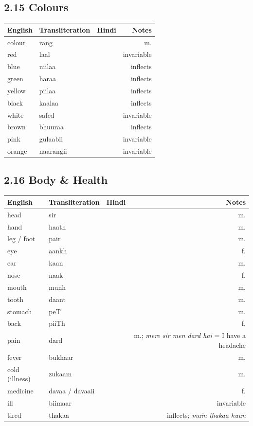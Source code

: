 \subsection{2.15 Colours}

\begin{tabular}{@{}VTDN@{}}
  \toprule
  English & Transliteration & Hindi & Notes \\
  \midrule
  colour & rang &  & m. \\
  red & laal &  & invariable \\
  blue & niilaa &  & inflects \\
  green & haraa &  & inflects \\
  yellow & piilaa &  & inflects \\
  black & kaalaa &  & inflects \\
  white & safed &  & invariable \\
  brown & bhuuraa &  & inflects \\
  pink & gulaabii &  & invariable \\
  orange & naarangii &  & invariable \\
  \bottomrule
\end{tabular}

\subsection{2.16 Body \& Health}

\begin{tabular}{@{}VTDN@{}}
  \toprule
  English & Transliteration & Hindi & Notes \\
  \midrule
  head & sir &  & m. \\
  hand & haath &  & m. \\
  leg / foot & pair &  & m. \\
  eye & aankh &  & f. \\
  ear & kaan &  & m. \\
  nose & naak &  & f. \\
  mouth & munh &  & m. \\
  tooth & daant &  & m. \\
  stomach & peT &  & m. \\
  back & piiTh &  & f. \\
  pain & dard &  & m.; \textit{mere sir men dard hai} = I have a headache \\
  fever & bukhaar &  & m. \\
  cold (illness) & zukaam &  & m. \\
  medicine & davaa / davaaii &  & f. \\
  ill & biimaar &  & invariable \\
  tired & thakaa &  & inflects; \textit{main thakaa huun} \\
  \bottomrule
\end{tabular}

